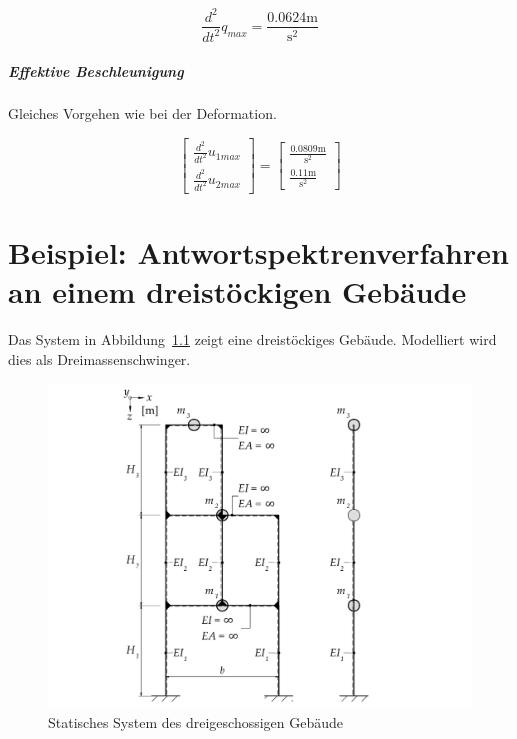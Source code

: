 \documentclass[
  letterpaper,
  DIV=11]{scrreprt}
\let\oldparagraph\paragraph
\renewcommand{\paragraph}[1]{\oldparagraph{#1}\mbox{}}
\begin{document}
\begin{equation}\frac{d^{2}}{d t^{2}} q_{max} = \frac{0.0624 \text{m}}{\text{s}^{2}}\end{equation}

\hypertarget{effektive-beschleunigung}{%
\paragraph{Effektive Beschleunigung}\label{effektive-beschleunigung}}

Gleiches Vorgehen wie bei der Deformation.

\begin{equation}\left[\begin{matrix}\frac{d^{2}}{d t^{2}} u_{1max}\\\frac{d^{2}}{d t^{2}} u_{2max}\end{matrix}\right] = \left[\begin{matrix}\frac{0.0809 \text{m}}{\text{s}^{2}}\\\frac{0.11 \text{m}}{\text{s}^{2}}\end{matrix}\right]\end{equation}

\hypertarget{beispiel-antwortspektrenverfahren-an-einem-dreistuxf6ckigen-gebuxe4ude}{%
\chapter{Beispiel: Antwortspektrenverfahren an einem dreistöckigen
Gebäude}\label{beispiel-antwortspektrenverfahren-an-einem-dreistuxf6ckigen-gebuxe4ude}}

Das System in Abbildung~\ref{fig-mms_3er_system} zeigt eine
dreistöckiges Gebäude. Modelliert wird dies als Dreimassenschwinger.

\begin{figure}[H]

{\centering \includegraphics{index_files/mediabag/bilder/aufgabe_mms_3er_system.pdf}

}

\caption{\label{fig-mms_3er_system}Statisches System des
dreigeschossigen Gebäude}

\end{figure}
\end{document}
